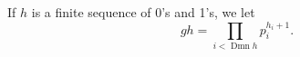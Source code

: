 If $h$ is a finite sequence of 0's and 1's, we let
$$gh = \prod_{i < \operatorname{Dmn} h} p_i^{h_i + 1}.$$

